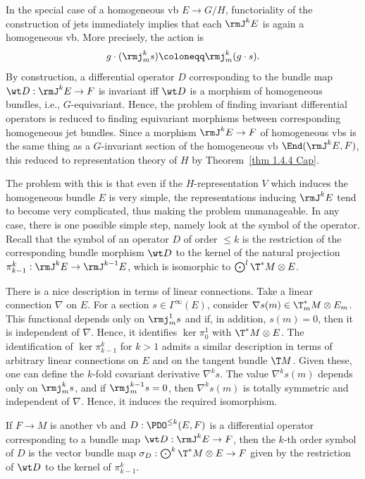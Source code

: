 In the special case of a homogeneous \gls{vb} $E\to G\slash H$, functoriality of the construction of jets immediately implies that each $\rmJ^k E$ is again a homogeneous \gls{vb}. More precisely, the action is 
\[g\cdot (\rmj^k_m s)\coloneqq \rmj^k_m(g\cdot s).\]
By construction, a differential operator $D$ corresponding to the bundle map $\wt D:\rmJ^k E\to F$ is invariant iff $\wt D$ is a morphism of homogeneous bundles, i.e., $G$-equivariant. Hence, the problem of finding invariant differential operators is reduced to finding equivariant morphisms between corresponding homogeneous jet bundles. Since a morphism $\rmJ^k E\to F$ of homogeneous \glspl{vb} is the same thing as a $G$-invariant section of the homogeneous \gls{vb} $\End(\rmJ^k E,F)$, this reduced to representation theory of $H$ by Theorem~\ref{thm 1.4.4 Cap}.

The problem with this is that even if the $H$-representation $V$ which induces the homogeneous bundle $E$ is very simple, the representations inducing $\rmJ^k E$ tend to become very complicated, thus making the problem unmanageable. In any case, there is one possible simple step, namely look at the symbol of the operator. Recall that the symbol of an operator $D$ of order $\leq k$ is the restriction of the corresponding bundle morphism $\wt D$ to the kernel of the natural projection $\pi^k_{k-1}:\rmJ^k E\to \rmJ^{k-1}E$, which is isomorphic to $\bigodot^l \T^\ast M\otimes E$.

There is a nice description in terms of linear connections. Take a linear connection $\nabla$ on $E$. For a section $s\in\Gamma^\infty(E)$, consider $\nabla s(m)\in\T^\ast_m M\otimes E_m$. This functional depends only on $\rmj^1_m s$ and if, in addition, $s(m)=0$, then it is independent of $\nabla$. Hence, it identifies $\ker \pi^1_0$ with $\T^\ast M\otimes E$. The identification of $\ker \pi^k_{k-1}$ for $k>1$ admits a similar description in terms of arbitrary linear connections on $E$ and on the tangent bundle $\T M$. Given these, one can define the $k$-fold covariant derivative $\nabla^k s$. The value $\nabla^k s(m)$ depends only on $\rmj^k_m s$, and if $\rmj^{k-1}_m s=0$, then $\nabla^k s(m)$ is totally symmetric and independent of $\nabla$. Hence, it induces the required isomorphism.

If $F\to M$ is another \gls{vb} and $D:\PDO^{\leq k}(E,F)$ is a differential operator corresponding to a bundle map $\wt D:\rmJ^k E\to F$, then the $k$-th order symbol of $D$ is the vector bundle map $\sigma_D:\bigodot^k \T^\ast M\otimes E\to F$ given by the restriction of $\wt D$ to the kernel of $\pi^k_{k-1}$.

